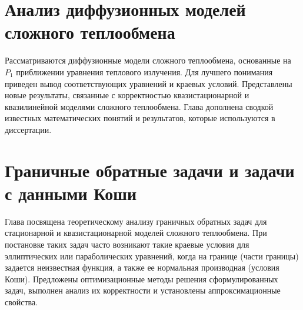\documentclass[a4paper,14pt,oneside,openany]{memoir}
\begin{document}
    \gappto\captionsrussian{\unskip} %
    



    \chapter{Анализ диффузионных моделей сложного теплообмена}\label{ch:ch1}
    Рассматриваются диффузионные модели сложного теплообмена, основанные
    на $P_1$ приближении уравнения теплового излучения.
    Для лучшего понимания приведен вывод соответствующих уравнений и краевых условий.
    Представлены новые результаты, связанные с корректностью квазистационарной
    и квазилинейной моделями сложного теплообмена.
    Глава дополнена сводкой известных математических понятий и результатов,
    которые используются в диссертации.
    
    
    
    
    
    


    \chapter{Граничные обратные задачи и задачи с данными Коши}\label{ch:ch2}
    Глава посвящена теоретическому анализу граничных обратных задач для
    стационарной и квазистационарной моделей сложного теплообмена.
    При постановке таких задач часто возникают такие краевые условия для
    эллиптических или параболических уравнений, когда на границе (части
    границы) задается неизвестная функция, а также ее нормальная производная
    (условия Коши).
    Предложены оптимизационные методы решения
    сформулированных задач, выполнен анализ их корректности и установлены
    аппроксимационные свойства.
    
    
    
    
\end{document}
